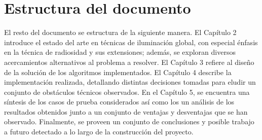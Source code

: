 
\section{Estructura del documento}
\label{sec:estructuraDelDocumento}

El resto del documento se estructura de la siguiente manera. El Capítulo 2 introduce el estado del arte en técnicas de iluminación global, con especial énfasis en la técnica de radiosidad y sus extensiones; además, se exploran diversos acercamientos alternativos al problema a resolver. El Capítulo 3 refiere al diseño de la solución de los algoritmos implementados. El Capítulo 4 describe la implementación realizada, detallando distintas decisiones tomadas para eludir un conjunto de obstáculos técnicos observados. En el Capítulo 5, se encuentra una síntesis de los casos de prueba considerados así como los un análisis de los resultados obtenidos junto a un conjunto de ventajas y desventajas que se han observado. Finalmente, se proveen un conjunto de conclusiones y posible trabajo a futuro detectado a lo largo de la construcción del proyecto.